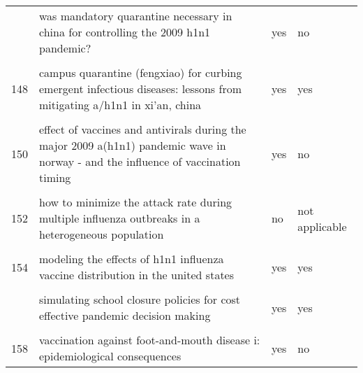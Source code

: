 \documentclass[
]{article}
\begin{document}
\begin{landscape}
\begin{longtable}{l>{\raggedright\arraybackslash}p{9cm}ll}
\addlinespace
146 & was mandatory quarantine necessary in china for controlling the 2009 h1n1 pandemic? & yes & no\\
\cellcolor{gray!6}{147} & \cellcolor{gray!6}{a contact-network-based simulation model for evaluating interventions under 'what-if' scenarios in epidemic} & \cellcolor{gray!6}{no} & \cellcolor{gray!6}{not applicable}\\
148 & campus quarantine (fengxiao) for curbing emergent infectious diseases: lessons from mitigating a/h1n1 in xi'an, china & yes & yes\\
\cellcolor{gray!6}{149} & \cellcolor{gray!6}{dynamic modelling of costs and health consequences of school closure during an influenza pandemic} & \cellcolor{gray!6}{no} & \cellcolor{gray!6}{not applicable}\\
150 & effect of vaccines and antivirals during the major 2009 a(h1n1) pandemic wave in norway - and the influence of vaccination timing & yes & no\\
\addlinespace
\cellcolor{gray!6}{151} & \cellcolor{gray!6}{estimating the value of containment strategies in delaying the arrival time of an influenza pandemic: a case study of travel restriction and patient isolation} & \cellcolor{gray!6}{no} & \cellcolor{gray!6}{not applicable}\\
152 & how to minimize the attack rate during multiple influenza outbreaks in a heterogeneous population & no & not applicable\\
\cellcolor{gray!6}{153} & \cellcolor{gray!6}{modeling strategies for controlling h1n1 outbreaks in china} & \cellcolor{gray!6}{yes} & \cellcolor{gray!6}{yes}\\
154 & modeling the effects of h1n1 influenza vaccine distribution in the united states & yes & yes\\
\cellcolor{gray!6}{155} & \cellcolor{gray!6}{modeling the impact of air, sea, and land travel restrictions supplemented by other interventions on the emergence of a new influenza pandemic virus} & \cellcolor{gray!6}{yes} & \cellcolor{gray!6}{yes}\\
\addlinespace
156 & simulating school closure policies for cost effective pandemic decision making & yes & yes\\
\cellcolor{gray!6}{157} & \cellcolor{gray!6}{the impact of school closures on pandemic influenza: assessing potential repercussions using a seasonal sir model} & \cellcolor{gray!6}{no} & \cellcolor{gray!6}{not applicable}\\
158 & vaccination against foot-and-mouth disease i: epidemiological consequences & yes & no\\

\end{longtable}
\end{landscape}
\end{document}
